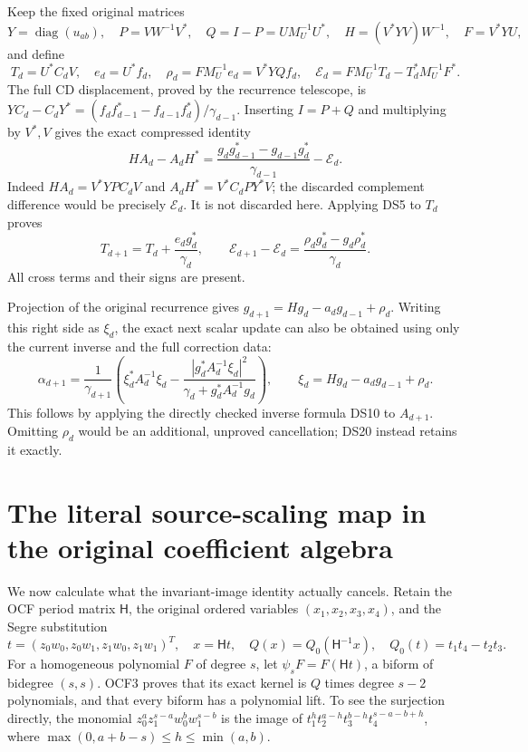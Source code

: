 Keep the fixed original matrices
\[
Y=\operatorname{diag}(u_{ab}),\quad
P=VW^{-1}V^*,\quad Q=I-P=UM_U^{-1}U^*,\quad
H=(V^*YV)W^{-1},\quad F=V^*YU,
\]
and define
\[
T_d=U^*C_dV,\quad e_d=U^*f_d,\quad
\rho_d=FM_U^{-1}e_d=V^*YQf_d,
\quad \mathcal E_d=FM_U^{-1}T_d-T_d^*M_U^{-1}F^*.
\]
The full CD displacement, proved by the recurrence telescope, is
\(YC_d-C_dY^*=(f_df_{d-1}^*-f_{d-1}f_d^*)/\gamma_{d-1}\).
Inserting \(I=P+Q\) and multiplying by \(V^*,V\) gives the exact
compressed identity
\begin{equation}\label{dsroot:eq:correctedCD}
HA_d-A_dH^*
=\frac{g_dg_{d-1}^*-g_{d-1}g_d^*}{\gamma_{d-1}}
-\mathcal E_d.
\tag{DS18}
\end{equation}
Indeed \(HA_d=V^*YPC_dV\) and
\(A_dH^*=V^*C_dPY^*V\); the discarded complement difference would
be precisely \(\mathcal E_d\). It is not discarded here.
Applying DS5 to \(T_d\) proves
\begin{equation}\label{dsroot:eq:correctionstep}
\boxed{T_{d+1}=T_d+\frac{e_dg_d^*}{\gamma_d},\qquad
\mathcal E_{d+1}-\mathcal E_d
=\frac{\rho_dg_d^*-g_d\rho_d^*}{\gamma_d}.}
\tag{DS19}
\end{equation}
All cross terms and their signs are present.

Projection of the original recurrence gives
\(g_{d+1}=Hg_d-a_dg_{d-1}+\rho_d\).
Writing this right side as \(\xi_d\), the exact next scalar update can
also be obtained using only the current inverse and the full correction
data:
\begin{equation}\label{dsroot:eq:nextalpha}
\alpha_{d+1}=\frac1{\gamma_{d+1}}
\left(\xi_d^*A_d^{-1}\xi_d
-\frac{|g_d^*A_d^{-1}\xi_d|^2}
{\gamma_d+g_d^*A_d^{-1}g_d}\right),
\qquad\xi_d=Hg_d-a_dg_{d-1}+\rho_d.
\tag{DS20}
\end{equation}
This follows by applying the directly checked inverse formula DS10
to \(A_{d+1}\). Omitting \(\rho_d\) would be an additional,
unproved cancellation; DS20 instead retains it exactly.

\section{The literal source-scaling map in the original coefficient algebra}

We now calculate what the invariant-image identity actually cancels.
Retain the OCF period matrix \(\mathsf H\), the original ordered
variables \((x_1,x_2,x_3,x_4)\), and the Segre substitution
\[
t=(z_0w_0,z_0w_1,z_1w_0,z_1w_1)^T,\quad x=\mathsf Ht,
\quad Q(x)=Q_0(\mathsf H^{-1}x),\quad
Q_0(t)=t_1t_4-t_2t_3.
\]
For a homogeneous polynomial \(F\) of degree \(s\), let
\(\psi_sF=F(\mathsf Ht)\), a biform of bidegree \((s,s)\).
OCF3 proves that its exact kernel is \(Q\) times degree \(s-2\)
polynomials, and that every biform has a polynomial lift. To see the
surjection directly, the monomial
\(z_0^a z_1^{s-a}w_0^b w_1^{s-b}\) is the image of
\(t_1^h t_2^{a-h}t_3^{b-h}t_4^{s-a-b+h}\), where
\(\max(0,a+b-s)\leq h\leq\min(a,b)\).

